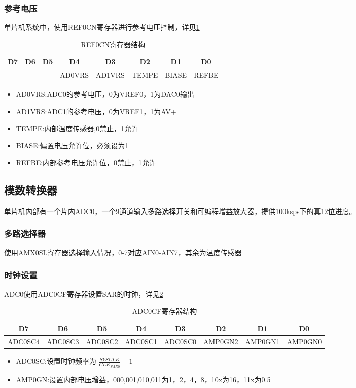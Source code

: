 \begin{spacing}{1.3}
\subsubsection{参考电压}
单片机系统中，使用REF0CN寄存器进行参考电压控制，详见\ref{table_REF0CN}
\begin{table}[!htbp]
  \caption{REF0CN寄存器结构}
  \label{table_REF0CN}
  \begin{tabular}{|c|c|c|c|c|c|c|c|}
    \hline
    D7&D6&D5&D4&D3&D2&D1&D0\\
      \hline
    &&&AD0VRS&AD1VRS&TEMPE&BIASE&REFBE\\
    \hline
  \end{tabular}
\end{table}
\begin{itemize}
  \item AD0VRS:ADC0的参考电压，0为VREF0，1为DAC0输出
  \item AD1VRS:ADC1的参考电压，0为VREF1，1为AV+
  \item TEMPE:内部温度传感器,0禁止，1允许
  \item BIASE:偏置电压允许位，必须设为1
  \item REFBE:内部参考电压允许位，0禁止，1允许
\end{itemize}
\subsection{模数转换器}
单片机内部有一个片内ADC0，一个9通道输入多路选择开关和可编程增益放大器，提供100ksps下的真12位进度。
\subsubsection{多路选择器}
使用AMX0SL寄存器选择输入情况，0-7对应AIN0-AIN7，其余为温度传感器
\subsubsection{时钟设置}
ADC0使用ADC0CF寄存器设置SAR的时钟，详见\ref{table_ADC0CF}
\begin{table}[!htbp]
  \caption{ADC0CF寄存器结构}
  \label{table_ADC0CF}
  \begin{tabular}{|c|c|c|c|c|c|c|c|}
    \hline
    D7&D6&D5&D4&D3&D2&D1&D0\\
      \hline
    ADC0SC4&ADC0SC3&ADC0SC2&ADC0SC1&ADC0SC0&AMP0GN2&AMP0GN1&AMP0GN0\\
    \hline
  \end{tabular}
\end{table}
\begin{itemize}
  \item ADC0SC:设置时钟频率为 $\frac{SYSCLK}{CLK_{SAR0}}-1$
  \item AMP0GN:设置内部电压增益，000,001,010,011为1，2，4，8，10x为16，11x为0.5
\end{itemize}

\end{spacing}
